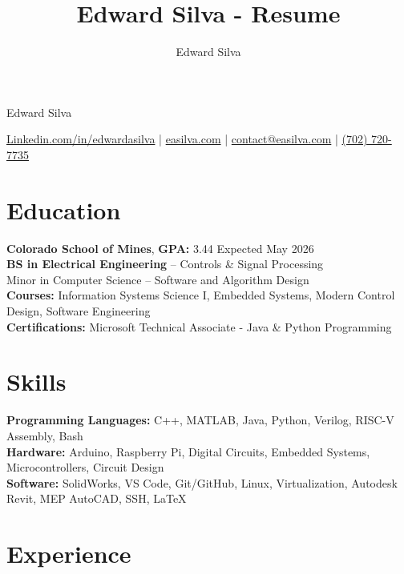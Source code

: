 \documentclass[11pt]{article}
\title{Edward Silva - Resume}
\author{Edward Silva}
\begin{document}
\thispagestyle{empty}

\centerline{\huge Edward Silva}
\vspace{3pt}

\centerline{
\href{https://www.linkedin.com/in/edwardasilva/}{Linkedin.com/in/edwardasilva}
| \href{https://easilva.com}{easilva.com}
| \href{mailto:contact@easilva.com}{contact@easilva.com} 
| \href{tel:702 720-7735}{(702) 720-7735}
}

\vspace{-10pt}
\section*{Education}
\vspace{1pt}

\textbf{Colorado School of Mines}, \textbf{GPA:} 3.44  \hfill Expected May 2026\\
\textbf{BS in Electrical Engineering} -- Controls \& Signal Processing  \\
Minor in Computer Science -- Software and Algorithm Design\\
\textbf{Courses:} Information Systems Science I, Embedded Systems, Modern Control Design, Software Engineering\\
\textbf{Certifications:} Microsoft Technical Associate - Java \& Python Programming

\vspace{-10pt}
\section*{Skills}
\vspace{0pt}

\textbf{Programming Languages:} C++, MATLAB, Java, Python, Verilog, RISC-V Assembly, Bash \\
\textbf{Hardware:} Arduino, Raspberry Pi, Digital Circuits, Embedded Systems, Microcontrollers, Circuit Design \\
\textbf{Software:} SolidWorks, VS Code, Git/GitHub, Linux, Virtualization, Autodesk Revit, MEP AutoCAD, SSH, LaTeX \\

\vspace{-14pt}
\section*{Experience}
\vspace{5pt}
\end{document}
